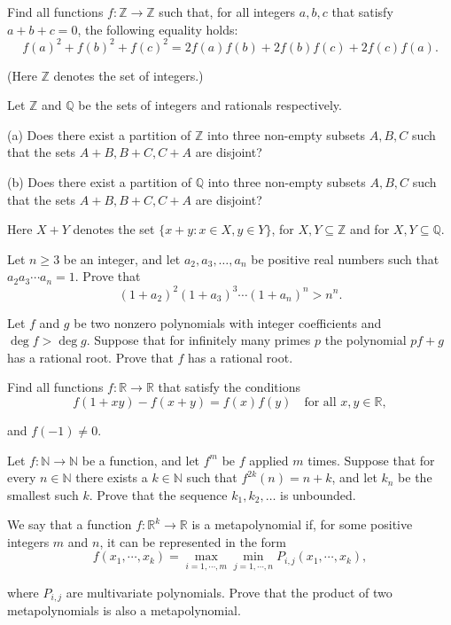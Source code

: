 \item[\textbf{A1.}]
Find all functions 
$f:\mathbb Z\rightarrow \mathbb Z$
 such that, for all integers 
$a,b,c$
 that satisfy 
$a+b+c=0$, 
 the following equality holds:
\[f(a)^2+f(b)^2+f(c)^2=2f(a)f(b)+2f(b)f(c)+2f(c)f(a).\]


(Here 
$\mathbb{Z}$
 denotes the set of integers.)

\item[\textbf{A2.}]
Let 
$\mathbb{Z}$
 and 
$\mathbb{Q}$
 be the sets of integers and rationals respectively.


(a) Does there exist a partition of 
$\mathbb{Z}$
 into three non-empty subsets 
$A,B,C$
 such that the sets 
$A+B, B+C, C+A$
 are disjoint?


(b) Does there exist a partition of 
$\mathbb{Q}$
 into three non-empty subsets 
$A,B,C$
 such that the sets 
$A+B, B+C, C+A$
 are disjoint?


Here 
$X+Y$
 denotes the set 
$\{ x+y : x \in X, y \in Y \}$, 
 for 
$X,Y \subseteq \mathbb{Z}$
 and  for 
$X,Y \subseteq \mathbb{Q}$.

\item[\textbf{A3.}]
Let 
$n\ge 3$
 be an integer, and let 
$a_2,a_3,\ldots ,a_n$
 be positive real numbers such that 
$a_{2}a_{3}\cdots a_{n}=1$.
 Prove that
\[(1 + a_2)^2 (1 + a_3)^3 \dotsm (1 + a_n)^n > n^n.\]

\item[\textbf{A4.}]
Let 
$f$
 and 
$g$
 be two nonzero polynomials with integer coefficients and 
$\deg f>\deg g$.
  Suppose that for infinitely many primes 
$p$
 the polynomial 
$pf+g$
 has a rational root. Prove that 
$f$
 has a rational root.

\item[\textbf{A5.}]
Find all functions 
$f:\mathbb{R} \rightarrow \mathbb{R}$
 that satisfy the conditions
\[f(1+xy)-f(x+y)=f(x)f(y) \quad \text{for all } x,y \in \mathbb{R},\]


and 
$f(-1) \neq 0$.

\item[\textbf{A6.}]
Let 
$f: \mathbb{N} \rightarrow \mathbb{N}$
 be a function, and let 
$f^m$
 be 
$f$
 applied 
$m$
 times. Suppose that for every 
$n \in \mathbb{N}$
 there exists a 
$k \in \mathbb{N}$
 such that 
$f^{2k}(n)=n+k$, 
 and let 
$k_n$
 be the smallest such 
$k$.
 Prove that the sequence 
$k_1,k_2,\ldots $
 is unbounded.

\item[\textbf{A7.}]
We say that a function 
$f:\mathbb{R}^k \rightarrow \mathbb{R}$
 is a metapolynomial if, for some positive integers 
$m$
 and 
$n$, 
 it can be represented in the form
\[f(x_1,\cdots , x_k )=\max_{i=1,\cdots , m} \min_{j=1,\cdots , n}P_{i,j}(x_1,\cdots , x_k),\]


where 
$P_{i,j}$
 are multivariate polynomials. Prove that the product of two metapolynomials is also a metapolynomial.

